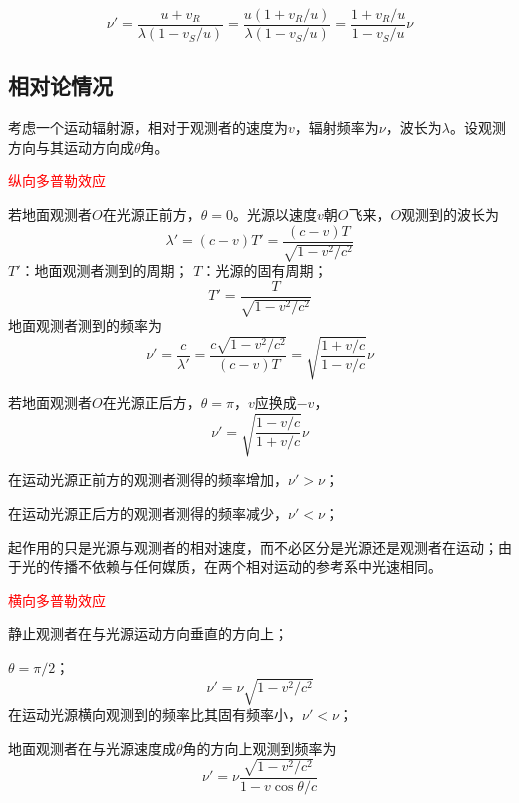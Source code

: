 \documentclass[12pt,a4paper]{article}
\begin{document}
\begin{equation}
\nu' = \frac{u+v_R}{\lambda(1-v_S/u)} = \frac{u(1+v_R/u) }{\lambda(1-v_S/u)} =  \frac{1+v_R/u}{1-v_S/u} \nu
\end{equation}


\subsection{相对论情况}
考虑一个运动辐射源，相对于观测者的速度为$v$，辐射频率为$\nu$，波长为$\lambda$。设观测方向与其运动方向成$\theta$角。

\textcolor{red}{纵向多普勒效应}

若地面观测者$O$在光源正前方，$\theta = 0$。光源以速度$v$朝$O$飞来，$O$观测到的波长为
\begin{equation}
\lambda' = (c -v) T' = \frac{(c-v)T}{\sqrt{1-v^2/c^2}}
\end{equation}
$T'$：地面观测者测到的周期；
$T$：光源的固有周期；
\begin{equation}
 T' = \frac{T}{\sqrt{1-v^2/c^2}}
\end{equation}
地面观测者测到的频率为
\begin{equation}
\nu' = \frac{c}{\lambda'} = \frac{c\sqrt{1-v^2/c^2}}{(c-v)T} = \sqrt{\frac{1+v/c}{1-v/c}} \nu
\end{equation}

若地面观测者$O$在光源正后方，$\theta = \pi$，$v$应换成$-v$，
\begin{equation}
\nu' = \sqrt{\frac{1-v/c}{1+v/c}} \nu
\end{equation}

在运动光源正前方的观测者测得的频率增加，$\nu' > \nu$；

在运动光源正后方的观测者测得的频率减少，$\nu' < \nu$；

起作用的只是光源与观测者的相对速度，而不必区分是光源还是观测者在运动；由于光的传播不依赖与任何媒质，在两个相对运动的参考系中光速相同。

\textcolor{red}{横向多普勒效应}

静止观测者在与光源运动方向垂直的方向上；

$\theta = \pi/2$；
\begin{equation}
\nu' = \nu \sqrt{1-v^2/c^2}
\end{equation}
在运动光源横向观测到的频率比其固有频率小，$\nu' < \nu$；

地面观测者在与光源速度成$\theta$角的方向上观测到频率为
\begin{equation}
\nu' = \nu \frac{\sqrt{1-v^2/c^2}}{1-v\cos \theta/c}
\end{equation}
\end{document}
